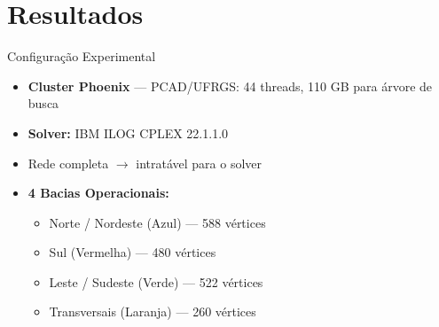 \documentclass{beamer}
\begin{document}

\section{Resultados}

\begin{frame}[plain]
  \sectionpage
\end{frame}

\begin{frame}{Configuração Experimental}
  \begin{itemize}
    \item \textbf{Cluster Phoenix} — PCAD/UFRGS: 44 threads, 110 GB para árvore de busca
    \item \textbf{Solver:} IBM ILOG CPLEX 22.1.1.0
    \item Rede completa $\rightarrow$ \alert{intratável} para o solver
    \item \textbf{4 Bacias Operacionais:}
      \begin{itemize}
        \item Norte / Nordeste (Azul) — 588 vértices
        \item Sul (Vermelha) — 480 vértices
        \item Leste / Sudeste (Verde) — 522 vértices
        \item Transversais (Laranja) — 260 vértices
      \end{itemize}
  \end{itemize}
\end{frame}
\end{document}
